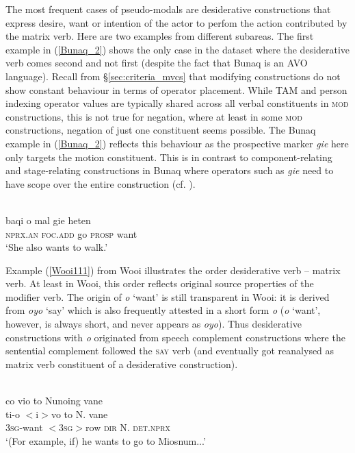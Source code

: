 The most frequent cases of pseudo-modals are desiderative constructions that express desire, want or intention of the actor to perfom the action contributed by the matrix verb. Here are two examples from different subareas. The first example in (\ref{Bunaq_2}) shows the only case in the dataset where the desiderative verb comes second and not first (despite the fact that Bunaq is an AVO language). Recall from §\ref{sec:criteria_mvcs} that modifying constructions do not show constant behaviour in terms of operator placement. While TAM and person indexing operator values are typically shared across all verbal constituents in \textsc{mod} constructions, this is not true for negation, where at least in some \textsc{mod} constructions, negation of just one constituent seems possible. The Bunaq example in (\ref{Bunaq_2}) reflects this behaviour as the prospective marker \textit{gie} here only targets the motion constituent. This is in contrast to component-relating and stage-relating constructions in Bunaq where operators such as \textit{gie} need to have scope over the entire construction (cf. \citealt[443f.]{schapper2009bunaq}).

\ea \label{Bunaq_2}
\\
\gll baqi o mal gie heten \\
\textsc{nprx}.\textsc{an} \textsc{foc}.\textsc{add} go \textsc{prosp} want \\
\glft `She also wants to walk.’\\ 
\z

Example (\ref{Wooi111}) from Wooi illustrates the order desiderative verb -- matrix verb. At least in Wooi, this order reflects  original source properties of the modifier verb. The origin of \textit{o} `want' is still transparent in Wooi: it is derived from \textit{oyo} `say' which is also frequently attested in a short form \textit{o} (\textit{o} `want', however, is always short, and never appears as \textit{oyo}). Thus desiderative constructions with \textit{o} originated from speech complement constructions where the sentential complement followed the \textsc{say} verb (and eventually got reanalysed as matrix verb constituent of a desiderative construction).

\ea \label{Wooi111}
\\
\glll co vio to Nunoing vane \\
ti-o $<$i$>$vo to N. vane \\
3\textsc{sg}-want $<$3\textsc{sg}$>$row \textsc{dir} N. \textsc{det}.\textsc{nprx} \\
\glft `(For example, if) he wants to go to Miosnum...'\\ 
\z

